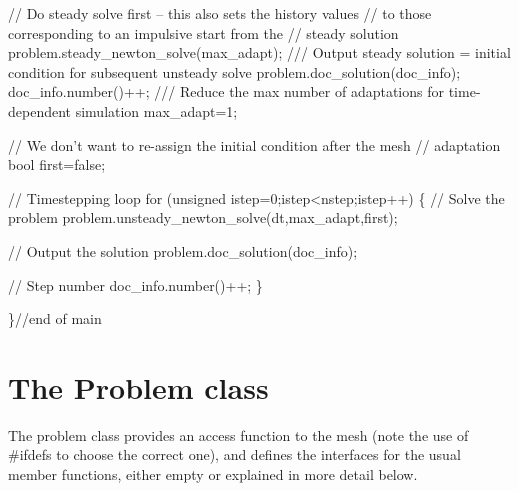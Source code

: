 \begin{DoxyCodeInclude}

 \textcolor{comment}{// Do steady solve first -- this also sets the history values}
 \textcolor{comment}{// to those corresponding to an impulsive start from the}
 \textcolor{comment}{// steady solution}
 problem.steady\_newton\_solve(max\_adapt);
 \textcolor{comment}{}
\textcolor{comment}{ /// Output steady solution = initial condition for subsequent unsteady solve}
\textcolor{comment}{} problem.doc\_solution(doc\_info);
 doc\_info.number()++;
\textcolor{comment}{}
\textcolor{comment}{ /// Reduce the max number of adaptations for time-dependent simulation}
\textcolor{comment}{} max\_adapt=1;

 \textcolor{comment}{// We don't want to re-assign the initial condition after the mesh}
 \textcolor{comment}{// adaptation}
 \textcolor{keywordtype}{bool} first=\textcolor{keyword}{false};
 
\textcolor{comment}{// Timestepping loop}
 \textcolor{keywordflow}{for} (\textcolor{keywordtype}{unsigned} istep=0;istep<nstep;istep++)
  \{ 
   \textcolor{comment}{// Solve the problem}
   problem.unsteady\_newton\_solve(dt,max\_adapt,first);
   
   \textcolor{comment}{// Output the solution}
   problem.doc\_solution(doc\_info);
   
   \textcolor{comment}{// Step number}
   doc\_info.number()++;
  \}
 
\}\textcolor{comment}{//end of main}

\end{DoxyCodeInclude}




 

\hypertarget{index_problem}{}\section{The Problem class}\label{index_problem}
The problem class provides an access function to the mesh (note the use of \#ifdefs to choose the correct one), and defines the interfaces for the usual member functions, either empty or explained in more detail below.

